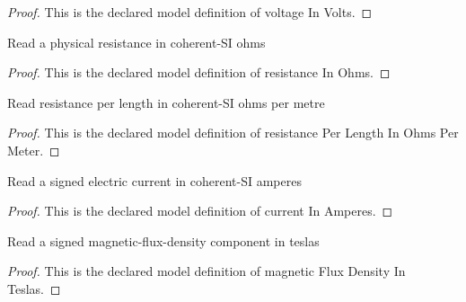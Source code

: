 \begin{proof}
  This is the declared model definition of voltage In Volts.
\end{proof}
\begin{definition}
  \label{def:physics:phyx-mini-0974:phyxminiproblems-problemphyxmini0974-resistanceinohms}
  Read a physical resistance in coherent-SI ohms
\end{definition}
\begin{proof}
  This is the declared model definition of resistance In Ohms.
\end{proof}
\begin{definition}
  \label{def:physics:phyx-mini-0974:phyxminiproblems-problemphyxmini0974-resistanceperlengthinohmspermeter}
  Read resistance per length in coherent-SI ohms per metre
\end{definition}
\begin{proof}
  This is the declared model definition of resistance Per Length In Ohms Per Meter.
\end{proof}
\begin{definition}
  \label{def:physics:phyx-mini-0974:phyxminiproblems-problemphyxmini0974-currentinamperes}
  Read a signed electric current in coherent-SI amperes
\end{definition}
\begin{proof}
  This is the declared model definition of current In Amperes.
\end{proof}
\begin{definition}
  \label{def:physics:phyx-mini-0974:phyxminiproblems-problemphyxmini0974-magneticfluxdensityinteslas}
  Read a signed magnetic-flux-density component in teslas
\end{definition}
\begin{proof}
  This is the declared model definition of magnetic Flux Density In Teslas.
\end{proof}
